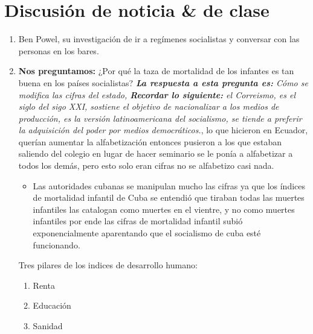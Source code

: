 \section{Discusión de noticia \& de clase}
\begin{enumerate}
    \item Ben Powel, su investigación de ir a regímenes socialistas y conversar con las personas en los bares.
    \item \textbf{Nos preguntamos:} ¿Por qué la taza de mortalidad de los infantes es tan buena en los países socialistas? \emph{\textbf{La respuesta a esta pregunta es: }Cómo se modifica las cifras del estado, \emph{\textbf{Recordar lo siguiente: }el Correismo, es el siglo del sigo XXI, sostiene el objetivo de nacionalizar a los medios de producción, es la versión latinoamericana del socialismo, se tiende a preferir la adquisición del poder por medios democráticos.}}, lo que hicieron en Ecuador, querían aumentar la alfabetización entonces pusieron a los que estaban saliendo del colegio en lugar de hacer seminario se le ponía a alfabetizar a todos los demás, pero esto solo eran cifras no se alfabetizo casi nada. 
    \begin{itemize}
        \item Las autoridades cubanas se manipulan mucho las cifras ya que los índices de mortalidad infantil de Cuba se entendió que tiraban todas las muertes infantiles las catalogan como muertes en el vientre, y no como muertes infantiles por ende las cifras de mortalidad infantil subió exponencialmente aparentando que el socialismo de cuba esté funcionando.
    \end{itemize}
    Tres pilares de los indices de desarrollo humano: 
    \begin{enumerate}
        \item Renta
        \item Educación 
        \item Sanidad
    \end{enumerate}
\end{enumerate}

